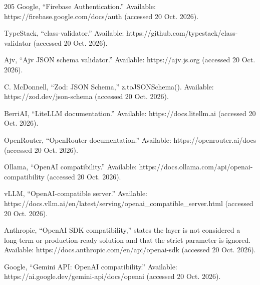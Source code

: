 \begin{thebibliography}{205}
 Google, ``Firebase Authentication.\allowbreak{}'' Available: https:/\allowbreak{}/\allowbreak{}firebase.\allowbreak{}google.\allowbreak{}com/\allowbreak{}docs/\allowbreak{}auth (accessed 20 Oct. 2026).

 TypeStack, ``class-\allowbreak{}validator.\allowbreak{}'' Available: https:/\allowbreak{}/\allowbreak{}github.\allowbreak{}com/\allowbreak{}typestack/\allowbreak{}class-\allowbreak{}validator (accessed 20 Oct. 2026).

 Ajv, ``Ajv JSON schema validator.'' Available: https:/\allowbreak{}/\allowbreak{}ajv.\allowbreak{}js.\allowbreak{}org (accessed 20 Oct. 2026).

 C. McDonnell, ``Zod: JSON Schema,'' z.\allowbreak{}toJSONSchema(). Available: https:/\allowbreak{}/\allowbreak{}zod.\allowbreak{}dev/\allowbreak{}json-\allowbreak{}schema (accessed 20 Oct. 2026).

 BerriAI, ``LiteLLM documentation.\allowbreak{}'' Available: https:/\allowbreak{}/\allowbreak{}docs.\allowbreak{}litellm.\allowbreak{}ai (accessed 20 Oct. 2026).

 OpenRouter, ``OpenRouter documentation.\allowbreak{}'' Available: https:/\allowbreak{}/\allowbreak{}openrouter.\allowbreak{}ai/\allowbreak{}docs (accessed 20 Oct. 2026).

 Ollama, ``OpenAI compatibility.\allowbreak{}'' Available: https:/\allowbreak{}/\allowbreak{}docs.\allowbreak{}ollama.\allowbreak{}com/\allowbreak{}api/\allowbreak{}openai-\allowbreak{}compatibility (accessed 20 Oct. 2026).

 vLLM, ``OpenAI-\allowbreak{}compatible server.'' Available: https:/\allowbreak{}/\allowbreak{}docs.\allowbreak{}vllm.\allowbreak{}ai/\allowbreak{}en/\allowbreak{}latest/\allowbreak{}serving/\allowbreak{}openai\_\allowbreak{}compatible\_\allowbreak{}server.\allowbreak{}html (accessed 20 Oct. 2026).

 Anthropic, ``OpenAI SDK compatibility,'' states the layer is not considered a long-term or production-\allowbreak{}ready solution and that the strict parameter is ignored. Available: https:/\allowbreak{}/\allowbreak{}docs.\allowbreak{}anthropic.\allowbreak{}com/\allowbreak{}en/\allowbreak{}api/\allowbreak{}openai-\allowbreak{}sdk (accessed 20 Oct. 2026).

 Google, ``Gemini API: OpenAI compatibility.\allowbreak{}'' Available: https:/\allowbreak{}/\allowbreak{}ai.\allowbreak{}google.\allowbreak{}dev/\allowbreak{}gemini-\allowbreak{}api/\allowbreak{}docs/\allowbreak{}openai (accessed 20 Oct. 2026).


\end{thebibliography}
